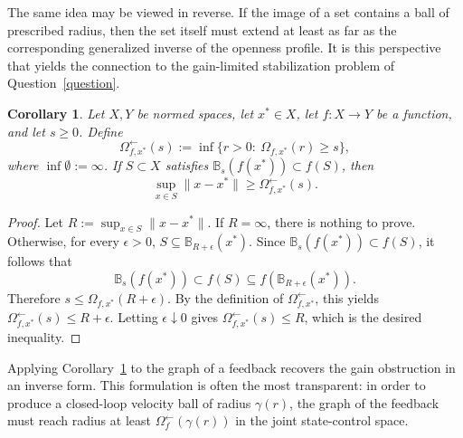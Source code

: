\documentclass[pdflatex,sn-mathphys-num]{sn-jnl}%
\theoremstyle{thmstyleone}%
\newtheorem{corollary}[theorem]{Corollary}
\theoremstyle{thmstyletwo}%
\theoremstyle{thmstylethree}%
\begin{document}

    The same idea may be viewed in reverse.  If the image of a set contains a ball of prescribed radius, then the set itself must extend at least as far as the corresponding generalized inverse of the openness profile.  It is this perspective that yields the connection to the gain-limited stabilization problem of Question~\ref{question}.


    \begin{corollary}\label{reverse norm cor}
        Let \(X,Y\) be normed spaces, let \(x^*\in X\), let \(f:X\to Y\) be a function, and let \(s\geq 0\). Define
        \[
            \Omega_{f,x^*}^{\leftarrow}(s)
            :=
            \inf\{r>0:\ \Omega_{f,x^*}(r)\geq s\},
        \]
        where \(\inf\emptyset:=\infty\). If \(S\subset X\) satisfies $\mathbb B_s(f(x^*))\subset f(S)$, then
        \[
            \sup_{x\in S}\|x-x^*\|
            \geq
            \Omega_{f,x^*}^{\leftarrow}(s).
        \]
    \end{corollary}


    \begin{proof}
        Let $R:=\sup_{x\in S}\|x-x^*\|$.  If $R=\infty$, there is nothing to prove. Otherwise, for every $\epsilon>0$, $S\subseteq \mathbb B_{R+\epsilon}(x^*)$.  Since \(\mathbb B_s(f(x^*))\subset f(S)\), it follows that
        \[
            \mathbb B_s(f(x^*))
            \subset f(S)
            \subseteq f(\mathbb B_{R+\epsilon}(x^*)).
        \]
        Therefore \(s\leq \Omega_{f,x^*}(R+\epsilon)\). By the definition of $\Omega_{f,x^*}^{\leftarrow}$, this yields $\Omega_{f,x^*}^{\leftarrow}(s)\leq R+\epsilon$. Letting $\epsilon\downarrow 0$ gives $\Omega_{f,x^*}^{\leftarrow}(s)\leq R$, which is the desired inequality.
    \end{proof}


    Applying Corollary~\ref{reverse norm cor} to the graph of a feedback recovers the gain obstruction in an inverse form.  This formulation is often the most transparent: in order to produce a closed-loop velocity ball of radius $\gamma(r)$, the graph of the feedback must reach radius at least $\Omega_f^{\leftarrow}(\gamma(r))$ in the joint state-control space.
\end{document}
